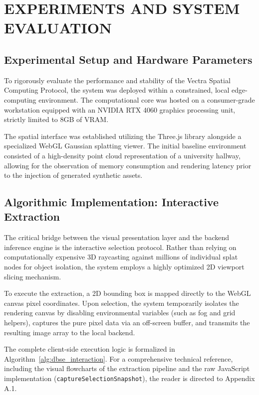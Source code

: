 \section{EXPERIMENTS AND SYSTEM EVALUATION}

\subsection{Experimental Setup and Hardware Parameters}
To rigorously evaluate the performance and stability of the Vectra Spatial Computing Protocol, the system was deployed within a constrained, local edge-computing environment. The computational core was hosted on a consumer-grade workstation equipped with an NVIDIA RTX 4060 graphics processing unit, strictly limited to 8GB of VRAM. 

The spatial interface was established utilizing the Three.js library alongside a specialized WebGL Gaussian splatting viewer. The initial baseline environment consisted of a high-density point cloud representation of a university hallway, allowing for the observation of memory consumption and rendering latency prior to the injection of generated synthetic assets. 

\subsection{Algorithmic Implementation: Interactive Extraction}
The critical bridge between the visual presentation layer and the backend inference engine is the interactive selection protocol. Rather than relying on computationally expensive 3D raycasting against millions of individual splat nodes for object isolation, the system employs a highly optimized 2D viewport slicing mechanism. 

To execute the extraction, a 2D bounding box is mapped directly to the WebGL canvas pixel coordinates. Upon selection, the system temporarily isolates the rendering canvas by disabling environmental variables (such as fog and grid helpers), captures the pure pixel data via an off-screen buffer, and transmits the resulting image array to the local backend. 

The complete client-side execution logic is formalized in Algorithm~\ref{alg:dbse_interaction}. For a comprehensive technical reference, including the visual flowcharts of the extraction pipeline and the raw JavaScript implementation (\texttt{captureSelectionSnapshot}), the reader is directed to Appendix A.1.

\vspace{0.3cm}
